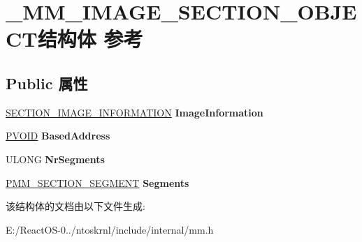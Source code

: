 \hypertarget{struct___m_m___i_m_a_g_e___s_e_c_t_i_o_n___o_b_j_e_c_t}{}\section{\+\_\+\+M\+M\+\_\+\+I\+M\+A\+G\+E\+\_\+\+S\+E\+C\+T\+I\+O\+N\+\_\+\+O\+B\+J\+E\+C\+T结构体 参考}
\label{struct___m_m___i_m_a_g_e___s_e_c_t_i_o_n___o_b_j_e_c_t}
\subsection*{Public 属性}
\begin{DoxyCompactItemize}
\item 
\mbox{\label{struct___m_m___i_m_a_g_e___s_e_c_t_i_o_n___o_b_j_e_c_t_ad0f2f2f026ed1cf8a21cc641992cd1b5}} 
\hyperlink{struct___s_e_c_t_i_o_n___i_m_a_g_e___i_n_f_o_r_m_a_t_i_o_n}{S\+E\+C\+T\+I\+O\+N\+\_\+\+I\+M\+A\+G\+E\+\_\+\+I\+N\+F\+O\+R\+M\+A\+T\+I\+ON} {\bfseries Image\+Information}
\item 
\mbox{\label{struct___m_m___i_m_a_g_e___s_e_c_t_i_o_n___o_b_j_e_c_t_ad4957196f0874e2f3a01b6190f882edd}} 
\hyperlink{interfacevoid}{P\+V\+O\+ID} {\bfseries Based\+Address}
\item 
\mbox{\label{struct___m_m___i_m_a_g_e___s_e_c_t_i_o_n___o_b_j_e_c_t_ace390fe11f618a2f7bcdd09c1e7cfd22}} 
U\+L\+O\+NG {\bfseries Nr\+Segments}
\item 
\mbox{\label{struct___m_m___i_m_a_g_e___s_e_c_t_i_o_n___o_b_j_e_c_t_a51391f145df62dc9c43dc713bf87a9ad}} 
\hyperlink{struct___m_m___s_e_c_t_i_o_n___s_e_g_m_e_n_t}{P\+M\+M\+\_\+\+S\+E\+C\+T\+I\+O\+N\+\_\+\+S\+E\+G\+M\+E\+NT} {\bfseries Segments}
\end{DoxyCompactItemize}


该结构体的文档由以下文件生成\+:\begin{DoxyCompactItemize}
\item 
E\+:/\+React\+O\+S-\/0../ntoskrnl/include/internal/mm.\+h\end{DoxyCompactItemize}
